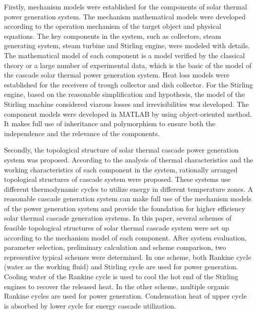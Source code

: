 {    Firstly, mechanism models were established for the components of solar thermal power generation system. The mechanism mathematical models were developed according to the operation mechanism of the target object and physical equations. The key components in the system, such as collectors, steam generating system, steam turbine and Stirling engine, were modeled with details. The mathematical model of each component is a model verified by the classical theory or a large number of experimental data, which is the basic of the model of the cascade solar thermal power generation system. Heat loss models were established for the receivers of trough collector and dish collector. For the Stirling engine, based on the reasonable simplification and hypothesis, the model of the Stirling machine considered viarous losses and irrevisibilities was developed. The component models were developed in MATLAB by using object-oriented method. It makes full use of inheritance and polymorphism to ensure both the independence and the relevance of the components.

    Secondly, the topological structure of solar thermal cascade power generation system was proposed. According to the analysis of thermal characteristics and the working characteristics of each component in the system, rationally arranged topological structures of cascade system were proposed. These systems use different thermodynamic cycles to utilize energy in different temperature zones. A reasonable cascade generation system can make full use of the mechanism models of the power generation system and provide the foundation for higher efficiency solar thermal cascade generation systems. In this paper, several schemes of feasible topological structures of solar thermal cascade system were set up according to the mechanism model of each component. After system evaluation, parameter selection, preliminary calculation and scheme comparison, two representive typical schemes were determined. In one scheme, both Rankine cycle (water as the working fluid) and Stirling cycle are used for power generation. Cooling water of the Rankine cycle is used to cool the hot end of the Stirling engines to recover the released heat. In the other scheme, multiple organic Rankine cycles are used for power generation. Condensation heat of upper cycle is absorbed by lower cycle for energy cascade utilization.

}
